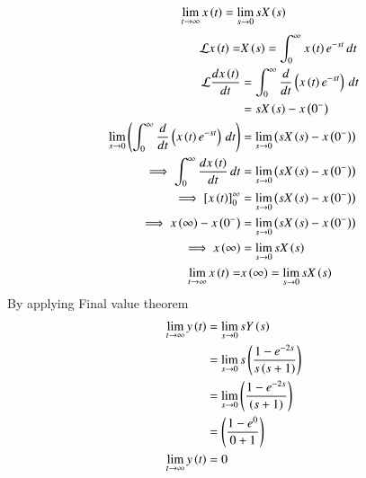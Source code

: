 \documentclass[a4,12pt,onecolumn]{IEEEtran}
\begin{document}
\begin{align}
\lim\limits_{t \to \infty} x\left(t\right) &= \lim\limits_{s \to 0} sX\left(s\right)\\
\end{align}
\begin{align}
\mathcal{L}x\left(t\right) = &X\left(s\right) = \int_{0}^{\infty} x\left(t\right)e^{-st} \, dt \\
\mathcal{L}\frac{dx\left(t\right)}{dt} &= \int_{0}^{\infty}\frac{d}{dt}\left(x\left(t\right)e^{-st}\right) \, dt \\
&= sX\left(s\right) - x\left(0^-\right)\\
 \lim\limits_{s \to 0}\left( \int_{0}^{\infty}\frac{d}{dt}\left(x\left(t\right)e^{-st}\right) \, dt\right)&=\lim\limits_{s \to 0}\left( sX\left(s\right) - x\left(0^-\right)\right)\\
 \implies \int_{0}^{\infty}\frac{dx\left(t\right)}{dt} \, dt &= \lim\limits_{s \to 0}\left( sX\left(s\right) - x\left(0^-\right)\right)\\
 \implies \left[x\left(t\right) \right]_0^{\infty} &=\lim\limits_{s \to 0}\left( sX\left(s\right) - x\left(0^-\right)\right)\\
 \implies x\left(\infty\right)-x\left(0^-\right)&=\lim\limits_{s \to 0}\left( sX\left(s\right) - x\left(0^-\right)\right)\\
 \implies x\left(\infty\right)&=\lim\limits_{s \to 0} sX\left(s\right)\\
 \lim\limits_{t \to \infty} x\left(t\right) = & x\left(\infty\right) = \lim\limits_{s \to 0} sX\left(s\right)
\end{align}
By applying Final value theorem
\begin{align}
\lim\limits_{t \to \infty} y\left(t\right)&= \lim\limits_{s \to 0} sY\left(s\right)\\
&=\lim\limits_{s \to 0} s\left(\frac{1-e^{-2s}}{s\left(s+1\right)}\right)\\
&=\lim\limits_{s \to 0} \left(\frac{1-e^{-2s}}{\left(s+1\right)}\right)\\
&= \left(\frac{1-e^{0}}{0+1}\right)\\
\lim\limits_{t \to \infty} y\left(t\right) &= 0
\end{align}
\end{document}
